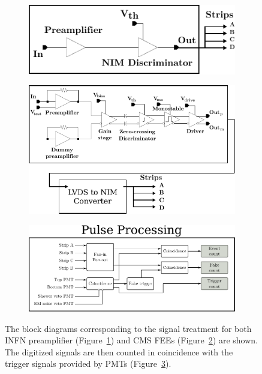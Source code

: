 	\begin{figure}[H]
		\begin{subfigure}{.5\linewidth}
		    \centering
			\includegraphics[width = 0.9\linewidth]{fig/chapt6/atlas-block-diagram-2013.pdf}
			\caption{\label{fig:Pulse-Processing:A}}
		\end{subfigure}
		\begin{subfigure}{.5\linewidth}
		    \centering
			\includegraphics[width = 0.9\linewidth]{fig/chapt6/cms-block-diagram-2013.pdf}
			\caption{\label{fig:Pulse-Processing:B}}
		\end{subfigure}
		\begin{subfigure}{\linewidth}
		    \centering
			\includegraphics[width = 0.8\linewidth]{fig/chapt6/pulse-processing-2013.pdf}
			\caption{\label{fig:Pulse-Processing:C}}
		\end{subfigure}
		\caption{\label{fig:Pulse-Processing} The block diagrams corresponding to the signal treatment for both INFN preamplifier (Figure~\ref{fig:Pulse-Processing:A}) and CMS FEEs (Figure~\ref{fig:Pulse-Processing:B}) are shown. The digitized signals are then counted in coincidence with the trigger signals provided by PMTs (Figure~\ref{fig:Pulse-Processing:C}).}
    \end{figure}
    
